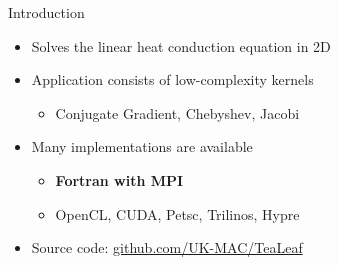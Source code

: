 \begin{frame}{Introduction}

\begin{itemize}
    \item Solves the linear heat conduction equation in 2D
    \item Application consists of low-complexity kernels
    \begin{itemize}
        \item Conjugate Gradient, Chebyshev, Jacobi
    \end{itemize}
    \item Many implementations are available
    \begin{itemize}
        \item \textbf{Fortran with MPI}
        \item OpenCL, CUDA, Petsc, Trilinos, Hypre
    \end{itemize}
    \item Source code: \href{https://github.com/UK-MAC/TeaLeaf}{github.com/UK-MAC/TeaLeaf} \cite{tearepo}

\end{itemize}
\end{frame}